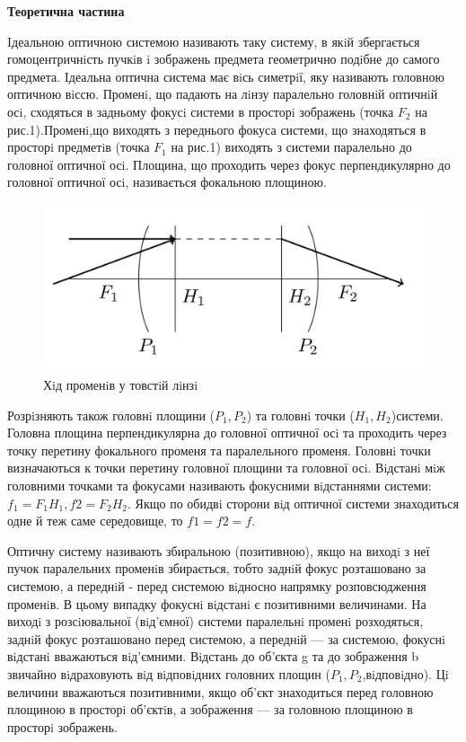 \begin{center}
    \Large{\textbf{Теоретична частина}}    
\end{center}

\vspace{1mm}

Iдеальною оптичною системою називають таку систему, в якiй збергається гомоцентричнiсть пучкiв i
зображень предмета геометрично подiбне до самого предмета. Iдеальна оптична система має вiсь симетрiї,
яку називають головною оптичною вiссю. Променi, що падають на лiнзу паралельно головнiй оптичнiй
осi, сходяться в задньому фокусi системи в просторi зображень (точка $F_2$ на рис.1).Променi,що виходять з
переднього фокуса системи, що знаходяться в просторi предметiв (точка $F_1$ на рис.1) виходять з системи
паралельно до головної оптичної осi. Площина, що проходить через фокус перпендикулярно
до головної оптичної осi, називається фокальною площиною.

\begin{figure}[h]    
    \centering
    \includegraphics[width=.6\textwidth]{assets/1.png}
    \caption{Хiд променiв у товстiй лiнзi}
\end{figure}

Розрiзняють також головнi площини ($P_1,P_2$) та головнi точки ($H_1, H_2$)системи. Головна площина перпендикулярна до
головної оптичної осi та проходить через точку перетину фокального променя та паралельного променя. Головнi точки
визначаються к точки перетину головної площини та головної осi. Вiдстанi мiж головними точками та фокусами називають
фокусними вiдстаннями системи: $f_1 = F_1H_1, f2 = F_2H_2$. 
Якщо по обидвi сторони вiд оптичної системи знаходиться одне й теж саме середовище, то $f1 = f2 = f$.

Оптичну систему називають збиральною (позитивною), якщо на виходi з неї пучок паралельних променiв
збирається, тобто заднiй фокус розташовано за системою, а переднiй - перед системою вiдносно
напрямку розповсюдження променiв. В цьому випадку фокуснi вiдстанi є позитивними величинами. На
виходi з розсiювальної (вiд’ємної) системи паралельнi променi розходяться, заднiй фокус розташовано 
перед системою, а переднiй — за системою, фокуснi вiдстанi вважаються вiд’ємними. Вiдстань до об’єкта g 
та до зображення b звичайно вiдраховують вiд вiдповiдних головних площин ($P_1, P_2$,вiдповiдно). 
Цi величини вважаються позитивними, якщо об’єкт знаходиться перед головною площиною в просторi об’єктiв,
а зображення — за головною площиною в просторi зображень.

